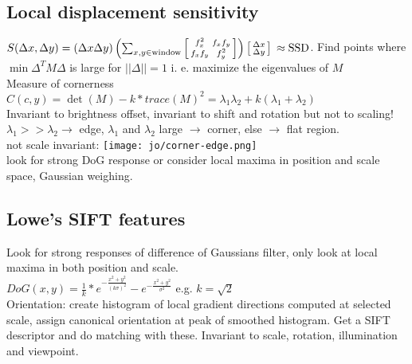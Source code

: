 \subsection*{Local displacement sensitivity }
$S (\Delta x, \Delta y) = (\Delta x \Delta y) \left( \sum_{x, y \in \text{window}}
\begin{bmatrix}
    \begin{smallmatrix} 
        f_x^{2} & f_x f_y \\ 
        f_x f_y & f_y^{2} 
    \end{smallmatrix} 
\end{bmatrix}
\right)
\begin{bmatrix}
    \begin{smallmatrix} 
        \Delta x \\ 
        \Delta y
    \end{smallmatrix} 
\end{bmatrix}  \\
\approx \text{SSD}$.
Find points where $\min \Delta^T M \Delta$ is large for $||\Delta || = 1$ i. e. maximize the eigenvalues of $M$\\
 Measure of cornerness\\
$C(c, y) = \det(M) - k * trace(M)^{2} = \lambda_1\lambda_2 + k(\lambda_1 + \lambda_2)$ \\
 Invariant to brightness offset, invariant to shift and rotation but not to scaling!
$\lambda_1 >> \lambda_2 \rightarrow$ edge, $\lambda_1$ and $ \lambda_2$ large $\rightarrow$ corner, else $\rightarrow$ flat region.\\
not scale invariant: \texttt{[image: jo/corner-edge.png]}\\
 look for strong DoG response or consider local maxima in position and scale space, Gaussian weighing.
\subsection*{Lowe's SIFT features}
Look for strong responses of difference of Gaussians  filter, only look at local maxima in both position and scale.\\
 $DoG(x, y) = \frac{1}{k}* e^{-\frac{x^{2} + y^{2}}{(k\sigma)^{2}}} - e^{-\frac{x^{2} + y^{2}}{\sigma^{2}}}$ e.g. $k = \sqrt{2}$\\
Orientation: create histogram of local gradient directions computed at selected scale, assign canonical orientation at peak of smoothed histogram. Get a SIFT descriptor  and do matching with these. Invariant to scale, rotation, illumination and viewpoint.
